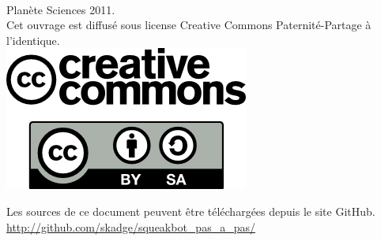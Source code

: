 \documentclass[a4paper,12pt]{book}
\begin{document}
\clearpage
\thispagestyle{empty}
~
\vfill
\begin{center}
	Planète Sciences 2011.\\
	Cet ouvrage est diffusé sous license Creative Commons Paternité-Partage à l'identique.\\
	\vspace{2cm}
	\includegraphics[scale=0.5]{logo_cc.png}
\end{center}

\vfill

\begin{center}
	Les sources de ce document peuvent être téléchargées depuis le site GitHub.
	\url{http://github.com/skadge/squeakbot_pas_a_pas/}
\end{center}

\vfill
\end{document}
